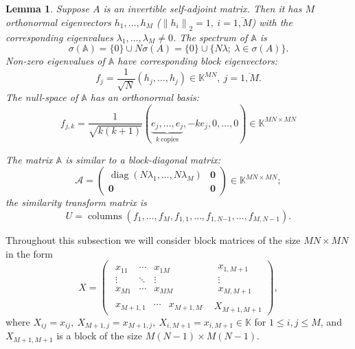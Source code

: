 \documentclass[a4paper]{jpconf}
\newtheorem{nkjpcslem}{Lemma}
\begin{document}
\begin{nkjpcslem}
    Suppose \( A \) is an invertible self-adjoint matrix.
    Then it has \( M \) orthonormal eigenvectors \( h_1, \ldots, h_M \)
    (\(\left\|h_i\right\|_2 = 1,\ i{=}\overline{1,M}\))
    with the corresponding eigenvalues
    \( \lambda_1, \ldots, \lambda_M \neq 0\).
    The spectrum of \( \mathbb{A} \) is
    \[
        \sigma(\mathbb{A}) = \{0\}\cup N\sigma(A) = \{0\} \cup \{N\lambda;\ \lambda\in\sigma(A) \}.
    \]
    Non-zero eigenvalues of \( \mathbb{A} \)
        have corresponding block eigenvectors:
    \[
        f_j = \frac{1}{\sqrt{N}} (h_j, \ldots, h_j)\in \mathbb{K}^{MN},\ j=\overline{1,M}.
    \]
    The null-space of \( \mathbb{A} \)
        has an orthonormal basis:
    \[
        f_{j,k} = \frac{1}{\sqrt{k(k+1)}}
        (
        \underbrace{e_j, \ldots, e_j}_{k\ \text{copies}},
        -ke_j,
        0, \ldots, 0
        ) \in\mathbb{K}^{{MN}{\times}{MN}}
    \]

    The matrix \( \mathbb{A} \) is similar to a block-diagonal matrix:
    \[
        \mathcal{A} =
        \left(\begin{array}{c|c}
            \operatorname{diag}(N\lambda_1,\ldots,N\lambda_M) & \mathbf{0} \\ \hline
            \mathbf{0} & \mathbf{0}
        \end{array}\right)\in\mathbb{K}^{{MN}{\times}{MN}};
    \]
    the similarity transform matrix is
    \[
        U = \operatorname{columns}
        \left(f_1, \ldots, f_M, f_{1,1}, \ldots, f_{1,N{-1}}, \ldots, f_{M,N{-}1}\right).
    \]
\end{nkjpcslem}

Throughout this subsection
    we will consider block matrices
    of the size \( {MN}{\times}{MN} \)
    in the form
    \[
    X =
        \left(\begin{array}{c|c}
            \begin{matrix}
                x_{11} & \cdots & x_{1M} \\
                \vdots & \ddots & \vdots \\
                x_{M1} & \cdots & x_{MM}
            \end{matrix} &
            \begin{matrix}
                x_{1,M+1} \\
                \vdots \\
                x_{M,M+1}
            \end{matrix} \\ \hline
            \begin{matrix}
                x_{M+1,1} &
                \cdots &
                x_{M+1,M}
            \end{matrix} &
            X_{M+1,M+1}
        \end{array}\right),
    \]
where
\( X_{ij}      {=} x_{ij},
 \ X_{M{+}1,j} {=} x_{M{+}1,j},
 \ X_{i,M{+}1} {=} x_{i,M{+}1} \in \mathbb{K} \)
for \( 1 \leq {i,j} \leq M \),
and
\( X_{M{+}1,M{+}1} \) is a block of the size \( {M(N{-}1){\times}M(N-1)} \).
\end{document}

